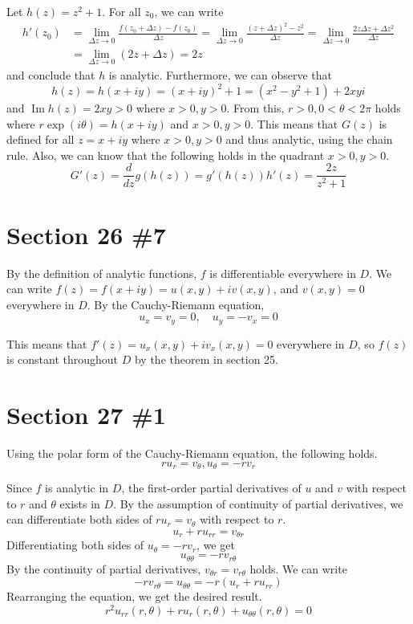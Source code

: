 \documentclass{scrartcl}
\begin{document}
Let \(h(z) = z^2 + 1\).
For all \(z_0\), we can write
\begin{align*}
  h'(z_0) &= \lim_{\Delta z \to 0} \frac{f(z_0 + \Delta z) - f(z_0)}{\Delta z} = \lim_{\Delta z \to 0} \frac{(z + \Delta z)^2 - z^2}{\Delta z} = \lim_{\Delta z \to 0} \frac{2z\Delta z + \Delta z^2}{\Delta z} \\
          &= \lim_{\Delta z \to 0} (2z + \Delta z) = 2z
\end{align*}
and conclude that \(h\) is analytic.
Furthermore, we can observe that
\[
  h(z) = h(x + iy) = (x + iy)^2 + 1 = (x^2 - y^2 + 1) + 2xyi
\]
and \(\operatorname{Im} h(z) = 2xy > 0\) where \(x > 0, y > 0\).
From this, \(r > 0, 0 < \theta < 2\pi\) holds where \(r\exp(i\theta) = h(x + iy)\) and \(x > 0, y > 0\).
This means that \(G(z)\) is defined for all \(z = x + iy\) where \(x > 0, y > 0\) and thus analytic, using the chain rule.
Also, we can know that the following holds in the quadrant \(x > 0, y > 0\).
\[
  G'(z) = \frac{d}{dz} g(h(z)) = g'(h(z)) h'(z) = \frac{2z}{z^2 + 1}
\]

\section{Section 26 \#7}
By the definition of analytic functions, \(f\) is differentiable everywhere in \(D\).
We can write \(f(z) = f(x + iy) = u(x, y) + iv(x, y)\), and \(v(x, y) = 0\) everywhere in \(D\).
By the Cauchy-Riemann equation,
\[
  u_x = v_y = 0, \quad u_y = -v_x = 0
\]

This means that \(f'(z) = u_x(x, y) + iv_x(x, y) = 0\) everywhere in \(D\), so \(f(z)\) is constant throughout \(D\) by the theorem in section 25.

\section{Section 27 \#1}
Using the polar form of the Cauchy-Riemann equation, the following holds.
\[
  ru_r = v_\theta, u_\theta = -rv_r
\]

Since \(f\) is analytic in \(D\), the first-order partial derivatives of \(u\) and \(v\) with respect to \(r\) and \(\theta\) exists in \(D\).
By the assumption of continuity of partial derivatives, we can differentiate both sides of \(ru_r = v_\theta\) with respect to \(r\).
\[
  u_r + ru_{rr} = v_{\theta r}
\]
Differentiating both sides of \(u_\theta = -rv_r\), we get
\[
  u_{\theta\theta} = -rv_{r\theta}
\]
By the continuity of partial derivatives, \(v_{\theta r} = v_{r\theta}\) holds.
We can write
\[
  -rv_{r\theta} = u_{\theta\theta} = -r(u_r + ru_{rr})
\]
Rearranging the equation, we get the desired result.
\[
  r^2 u_{rr}(r, \theta) + ru_r(r, \theta) + u_{\theta\theta}(r, \theta) = 0
\]
\end{document}

